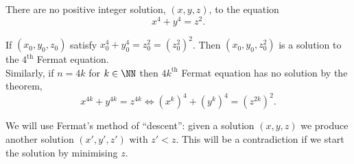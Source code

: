 \documentclass[12pt, a4paper]{article}
\begin{document}
\begin{theorem}
    There are no positive integer solution, \((x,y,z)\), to the equation
    \[x^4+y^4=z^2.\]
\end{theorem}

\begin{mdremark}
    If \((x_0,y_0,z_0)\) satisfy \(x_0^4 + y_0^4 =z_0^2=(z_0^2)^2\). Then \((x_0,y_0,z_0^2)\) is a solution to the \(4^{\text{th}}\) Fermat equation. \\
    Similarly, if \(n=4k\) for \(k \in \NN\) then \(4k^{\text{th}}\) Fermat equation has no solution by the theorem,
    \[x^{4k}+y^{4k}=z^{4k} \iff (x^k)^4+(y^k)^4=(z^{2k})^2.\]
\end{mdremark}

\begin{mdnote}
    We will use Fermat's method of ``descent'': given a solution \((x,y,z)\) we produce another solution \((x',y',z')\) with \(z'<z\). This will be a contradiction if we start the solution by minimising \(z\).
\end{mdnote}
\end{document}
